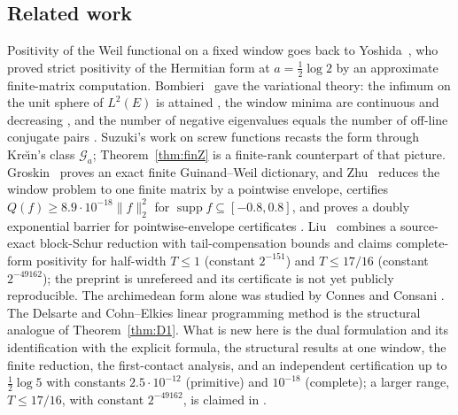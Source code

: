 \documentclass[11pt]{amsart}
\theoremstyle{definition}
\theoremstyle{remark}
\newcommand{\supp}{\operatorname{supp}}
\begin{document}
\subsection{Related work}\label{subsec:related}
Positivity of the Weil functional on a fixed window goes back to Yoshida~\cite{Yoshida1992}, who proved
strict positivity of the Hermitian form at $a=\tfrac12\log 2$ by an approximate finite-matrix computation.
Bombieri~\cite{Bombieri2000} gave the variational theory: the infimum on the unit sphere of $L^2(E)$ is
attained \cite[Thm.~3]{Bombieri2000}, the window minima are continuous and decreasing
\cite[Thm.~5]{Bombieri2000}, and the number of negative eigenvalues equals the number of off-line conjugate
pairs \cite[Thm.~8]{Bombieri2000}. Suzuki's work on screw functions
\cite{Suzuki2023jlms,Suzuki2023screwline,Suzuki2025hilbert} recasts the form through Kre\u{\i}n's class
$\mathcal G_a$; Theorem~\ref{thm:finZ} is a finite-rank counterpart of that picture. Groskin~\cite{Groskin2026}
proves an exact finite Guinand--Weil dictionary, and Zhu~\cite{Zhu2026} reduces the window problem to one
finite matrix by a pointwise envelope, certifies $Q(f)\ge 8.9\cdot 10^{-18}\|f\|_2^2$ for
$\supp f\subseteq[-0.8,0.8]$, and proves a doubly exponential barrier for pointwise-envelope certificates
\cite[Thm.~1.4]{Zhu2026}. Liu~\cite{Liu2026} combines a source-exact block-Schur reduction with
tail-compensation bounds and claims complete-form positivity for half-width $T\le1$ (constant $2^{-151}$)
and $T\le17/16$ (constant $2^{-49162}$); the preprint is unrefereed and its certificate is not yet
publicly reproducible. The archimedean form alone was studied by Connes and Consani
\cite{ConnesConsani2021}. The Delsarte and Cohn--Elkies linear programming method \cite{CohnElkies2003} is
the structural analogue of Theorem~\ref{thm:D1}. What is new here is the dual formulation and its
identification with the explicit formula, the structural results at one window, the finite reduction, the
first-contact analysis, and an independent certification up to $\frac12\log5$ with constants
$2.5\cdot10^{-12}$ (primitive) and $10^{-18}$ (complete); a larger range, $T\le17/16$, with constant
$2^{-49162}$, is claimed in \cite{Liu2026}.
\end{document}
